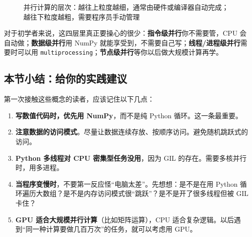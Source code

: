 \begin{figure}[htbp]
\centering
{}
\caption{并行计算的层次：越往上粒度越细，通常由硬件或编译器自动完成；越往下粒度越粗，需要程序员手动管理}
\end{figure}

对于初学者来说，这四层里真正要操心的很少：\textbf{指令级并行}你不需要管，CPU 会自动做；\textbf{数据级并行}用 NumPy 就能享受到，不需要自己写；\textbf{线程/进程级并行}需要时可以用 \verb|multiprocessing|；\textbf{节点级并行}等你以后做大规模计算再学。

\subsection*{本节小结：给你的实践建议}

第一次接触这些概念的读者，应该记住以下几点：

\begin{enumerate}
    \item \textbf{写数值代码时，优先用 NumPy}，而不是纯 Python 循环。这一条最重要。
    
    \item \textbf{注意数据的访问模式}。尽量让数据连续存放、按顺序访问。避免随机跳跃式的访问。
    
    \item \textbf{Python 多线程对 CPU 密集型任务没用}，因为 GIL 的存在。需要多核并行时，用多进程。
    
    \item \textbf{当程序变慢时}，不要第一反应怪“电脑太差”。先想想：是不是在用 Python 循环遍历大数组？是不是内存访问模式很“跳跃”？是不是开了很多线程但被 GIL 卡住？
    
    \item \textbf{GPU 适合大规模并行计算}（比如矩阵运算），CPU 适合复杂逻辑。以后遇到“同一种计算要做几百万次”的任务，就可以考虑用 GPU。
\end{enumerate}

